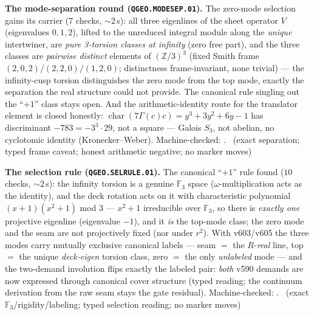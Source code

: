 \documentclass[11pt,a4paper]{article}
\theoremstyle{definition}
\begin{document}
\par\smallskip\noindent\textbf{The mode-separation round
(\texttt{QGEO.MODESEP.01}).}
The zero-mode selection gains its carrier ($7$ checks, ${\sim}2$\,s):
all three eigenlines of the sheet operator $V$ (eigenvalues $0,1,2$),
lifted to the unreduced integral module along the \emph{unique}
intertwiner, are \emph{pure 3-torsion classes at infinity} (zero free
part), and the three classes are \emph{pairwise distinct} elements of
$(\mathbb{Z}/3)^3$ (fixed Smith frame $(2,0,2)/(2,2,0)/(1,2,0)$;
distinctness frame-invariant, none trivial) --- the infinity-cusp
torsion distinguishes the zero mode from the top mode, exactly the
separation the real structure could not provide.  The canonical rule
singling out the ``$+1$'' class stays open.  And the
arithmetic-identity route for the translator element is closed
honestly: $\operatorname{char}(7\Gamma(c)c)=y^3+3y^2+6y-1$ has
discriminant $-783=-3^3\cdot29$, not a square --- Galois $S_3$, not
abelian, no cyclotomic identity (Kronecker--Weber).
Machine-checked: .
\mE\ (exact separation; typed frame caveat; honest arithmetic
negative; no marker moves)
\par\smallskip

\par\smallskip\noindent\textbf{The selection rule
(\texttt{QGEO.SELRULE.01}).}
The canonical ``$+1$'' rule found ($10$ checks, ${\sim}2$\,s): the
infinity torsion is a genuine $\mathbb{F}_3$ space
($\omega$-multiplication acts as the identity), and the deck rotation
acts on it with characteristic polynomial $(x+1)(x^2+1)$ mod $3$ ---
$x^2+1$ irreducible over $\mathbb{F}_3$, so there is \emph{exactly
one} projective eigenline (eigenvalue $-1$), and it \emph{is} the
top-mode class; the zero mode and the seam are not projectively fixed
(nor under $r^2$).  With v603/v605 the three modes carry mutually
exclusive canonical labels --- seam $=$ the $R$-\emph{real} line, top
$=$ the unique \emph{deck-eigen} torsion class, zero $=$ the only
\emph{unlabeled} mode --- and the two-demand involution flips exactly
the labeled pair: \emph{both} v590 demands are now expressed through
canonical cover structure (typed reading; the continuum derivation
from the raw seam stays the gate residual).
Machine-checked: .
\mE\ (exact $\mathbb{F}_3$/rigidity/labeling; typed selection
reading; no marker moves)
\par\smallskip
\end{document}
